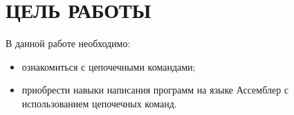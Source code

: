 \section{ЦЕЛЬ РАБОТЫ}

В данной работе необходимо:

\begin{itemize}

  \item ознакомиться с цепочечными командами;

  \item приобрести навыки написания программ на языке Ассемблер 
    с использованием цепочечных команд.

\end{itemize}

\newpage
